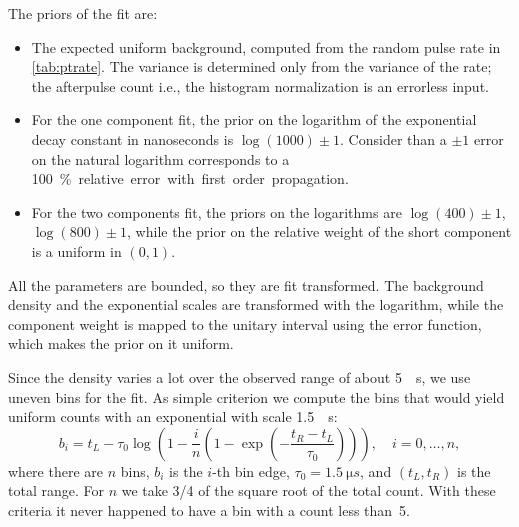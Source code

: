 The priors of the fit are:
%
\begin{itemize}
    
    \item The expected uniform background, computed from the random pulse rate
    in \autoref{tab:ptrate}. The variance is determined only from the variance
    of the rate; the afterpulse count i.e., the histogram normalization is an
    errorless input.
    
    \item For the one component fit, the prior on the logarithm of the
    exponential decay constant in nanoseconds is $\log(1000) \pm 1$. Consider
    than a $\pm 1$ error on the natural logarithm corresponds to a \SI{100}\%
    relative error with first order propagation.
    
    \item For the two components fit, the priors on the logarithms are
    $\log(400) \pm 1$, $\log(800) \pm 1$, while the prior on the relative
    weight of the short component is a uniform in $(0, 1)$.
    
\end{itemize}

All the parameters are bounded, so they are fit transformed. The background
density and the exponential scales are transformed with the logarithm, while
the component weight is mapped to the unitary interval using the error
function, which makes the prior on it uniform.

Since the density varies a lot over the observed range of about \SI{5}{\micro
s}, we use uneven bins for the fit. As simple criterion we compute the bins
that would yield uniform counts with an exponential with scale \SI{1.5}{\micro
s}:
%
\begin{equation}
    b_i = t_L - \tau_0 \log\left(1 - \frac in
    \left(1 - \exp\left(-\frac{t_R - t_L}{\tau_0}\right)\right)\right),
    \quad i = 0, \ldots, n,
\end{equation}
%
where there are $n$ bins, $b_i$ is the $i$-th bin edge, $\tau_0 =
\SI{1.5}{\micro s}$, and $(t_L, t_R)$ is the total range. For $n$ we take 3/4
of the square root of the total count. With these criteria it never happened
to have a bin with a count less than~5.


